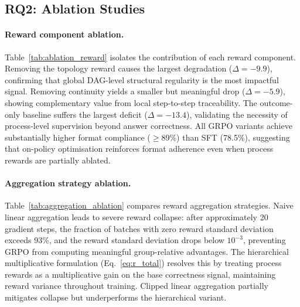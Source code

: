 \subsection{RQ2: Ablation Studies}
\label{sec:rq2}



\paragraph{Reward component ablation.}
Table~\ref{tab:ablation_reward} isolates the contribution of each reward component.
Removing the topology reward causes the largest degradation ($\Delta = -9.9$), confirming that global DAG-level structural regularity is the most impactful signal.
Removing continuity yields a smaller but meaningful drop ($\Delta = -5.9$), showing complementary value from local step-to-step traceability.
The outcome-only baseline suffers the largest deficit ($\Delta = -13.4$), validating the necessity of process-level supervision beyond answer correctness.
All GRPO variants achieve substantially higher format compliance ($\geq$89\%) than SFT (78.5\%), suggesting that on-policy optimisation reinforces format adherence even when process rewards are partially ablated.



\paragraph{Aggregation strategy ablation.}
Table~\ref{tab:aggregation_ablation} compares reward aggregation strategies.
Naive linear aggregation leads to severe reward collapse: after approximately 20 gradient steps, the fraction of batches with zero reward standard deviation exceeds 93\%, and the reward standard deviation drops below $10^{-3}$, preventing GRPO from computing meaningful group-relative advantages.
The hierarchical multiplicative formulation (Eq.~\ref{eq:r_total}) resolves this by treating process rewards as a multiplicative gain on the base correctness signal, maintaining reward variance throughout training.
Clipped linear aggregation partially mitigates collapse but underperforms the hierarchical variant.



